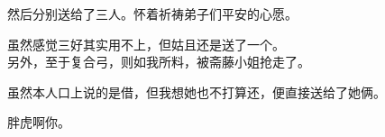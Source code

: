 然后分别送给了三人。怀着祈祷弟子们平安的心愿。

虽然感觉三好其实用不上，但姑且还是送了一个。\\

另外，至于复合弓，则如我所料，被斋藤小姐抢走了。

虽然本人口上说的是借，但我想她也不打算还，便直接送给了她俩。

胖虎啊你。\\
